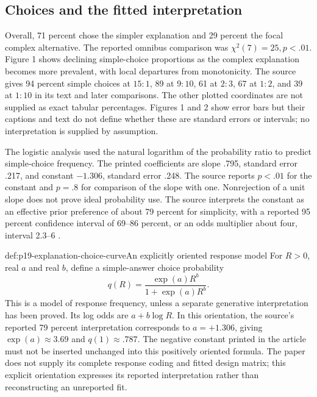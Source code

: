 \subsection{Choices and the fitted interpretation}

Overall, 71 percent chose the simpler explanation and 29 percent
the focal complex alternative. The reported omnibus comparison was
\(\chi^2(7)=25,p<.01\).
Figure 1 shows declining simple-choice proportions as the
complex explanation becomes more prevalent, with local departures
from monotonicity. The source gives 94 percent simple choices
at \(15:1\), 89 at \(9:10\), 61 at \(2:3\), 67 at \(1:2\),
and 39 at \(1:10\) in its text and later comparisons.
The other plotted coordinates are not supplied as exact tabular
percentages. Figures 1 and 2 show error bars but their captions
and text do not define whether these are standard errors or
intervals; no interpretation is supplied by assumption.

The logistic analysis used the natural logarithm of the probability
ratio to predict simple-choice frequency. The printed coefficients
are slope .795, standard error .217, and constant \(-1.306\),
standard error .248. The source reports \(p<.01\) for the
constant and \(p=.8\) for comparison of the slope with one.
Nonrejection of a unit slope does not prove ideal probability use.
The source interprets the constant as an effective prior preference
of about 79 percent for simplicity, with a reported 95 percent
confidence interval of 69--86 percent, or an odds multiplier
about four, interval 2.3--6
\cite[pp.~241--242]{Lombrozo2007SimplicityProbability}.

\begin{hbdefinition}{def:p19-explanation-choice-curve}{An explicitly oriented response model}
For \(R>0\), real \(a\) and real \(b\), define a simple-answer
choice probability
\[
 q(R)=\frac{\exp(a)R^b}{1+\exp(a)R^b}.
\]
This is a model of response frequency, unless a separate generative
interpretation has been proved. Its log odds are \(a+b\log R\).
In this orientation, the source's reported 79 percent interpretation
corresponds to \(a=+1.306\), giving
\(\exp(a)\approx3.69\) and \(q(1)\approx.787\).
The negative constant printed in the article must not be inserted
unchanged into this positively oriented formula.
The paper does not supply its complete response coding and fitted
design matrix; this explicit orientation expresses its reported
interpretation rather than reconstructing an unreported fit.
\end{hbdefinition}

